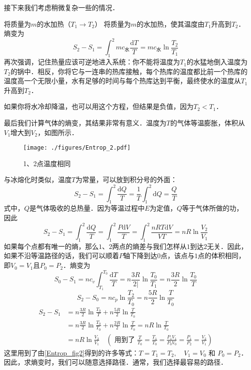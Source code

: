 接下来我们考虑稍微复杂一些的情况．

\begin{example}{将质量为$m $的水加热（$T_1\to T_2$）}
将质量为$m$的水加热，使其温度由$T_1$升高到$T_2$．熵变为
\begin{equation}
S_2-S_1=\int_1^2{mc_{\text{水}}\frac{\text{d}T}{T}}=mc_{\text{水}}\ln \frac{T_2}{T_1}
\end{equation}
再次强调，记住热量应该可逆地进入系统：你不能将温度为$T_1$的水猛地倒入温度为$T_2$的锅中．相反，你将它与一连串的热库接触，每个热库的温度都比前一个热库的温度高一个无限小量，水有足够的时间与每个热库达到平衡，最终使水的温度从$T_1$升高到$T_2$．

如果你将水冷却降温，也可以用这个方程，但结果是负值，因为$T_2<T_1$．

最后我们计算气体的熵变，其结果非常有意义．温度为$T $的气体等温膨胀，体积从$V_1$增大到$V_2$，如图所示．
\begin{figure}[ht]
\centering
\texttt{[image: ./figures/Entrop\_2.pdf]}
\caption{1、2点温度相同} \label{Entrop_fig2}
\end{figure}
\end{example}
与冰熔化时类似，温度$T $为常量，可以放到积分号的外面：
\begin{equation}
S_2-S_1=\int_1^2{\frac{\text{d}Q}{T}}=\frac{1}{T}\int_1^2{\text{d}Q=\frac{Q}{T}}
\end{equation}
式中，$ Q $是气体吸收的总热量．因为等温过程中$E$为定值，$Q$等于气体所做的功，因此
\begin{equation}
S_2-S_1=\int_1^2{\frac{\text{d}Q}{T}}=\int_1^2{\frac{P\text{d}V}{T}}=\int_1^2{\frac{nRT\text{d}V}{VT}=nR\ln \frac{V_2}{V_1}}
\end{equation}
如果每个点都有唯一的熵，那么$1$、$2$两点的熵差与我们怎样从$1$到达$2 $无关．因此，如果不沿等温路径的话，我们可以顺着$P $轴下降到达$0 $点，该点与$1 $点的体积相同，即$V_0=V_1$且$P_0=P_2$．熵变为
\begin{equation}
S_{0}-S_{1}=n c_{v} \int_{T_{1}}^{T_{0}} \frac{\mathrm{d} T}{T}=n \frac{3 R}{2 |} \ln \frac{T_{0}}{T_{1}}=n \frac{3 R}{2} \ln \frac{T_{0}}{T}
\end{equation}
\begin{equation}
S_{2}-S_{0}=n c_{p} \ln \frac{T_{2}}{T_{0}}=n \frac{5 R}{2} \ln \frac{T}{T_{0}}
\end{equation}
\begin{equation}
\begin{aligned} S_{2}-S_{1} &=n \frac{3 R}{2} \ln \frac{T_{0}}{T}+n \frac{5 R}{2} \ln \frac{T}{T_{0}} \\ &=n \frac{3 R}{2} \ln \frac{T_{0}}{T_{0}}+n \frac{2 R}{2} \ln \frac{T}{T_{0}}=n R \ln \frac{T}{T_{0}} \\ &=n R \ln \frac{V_{2}}{V_{1}} \quad\left(\text { 用到了 } \frac{T}{T_{0}}=\frac{T_{1}}{T_{0}}=\frac{P_{1} V_{1}}{P_{0} V_{0}}=\frac{P_{1}}{P_{2}}=\frac{V_{2}}{V_{1}}\right) \end{aligned}
\end{equation}
这里用到了由\autoref{Entrop_fig2}得到的许多等式：$T=T_{1}=T_{2}, \quad V_{1}=V_{0} \text { 和 } P_{0}=P_{2}$．因此，求熵变时，我们可以随意选择路径．通常，我们选择最容易的路径．


